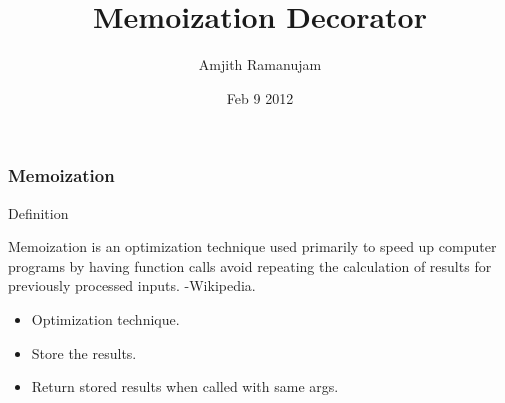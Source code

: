 \documentclass[c]{beamer}
\begin{document}
\title[Memoization Decorator]{Memoization Decorator%
  \label{memoization-decorator}}
\author[Amjith Ramanujam]{Amjith Ramanujam}
\date{Feb 9 2012}
\maketitle















\begin{frame}[fragile]
\frametitle{Memoization}


\begin{block}{ Definition }

Memoization is an optimization technique used primarily to speed up computer
programs by having function calls avoid repeating the calculation of results
for previously processed inputs. -Wikipedia.

\end{block}
\begin{itemize}

\item Optimization technique.

\item Store the results.

\item Return stored results when called with same args.
\end{itemize}
\end{frame}
\end{document}
